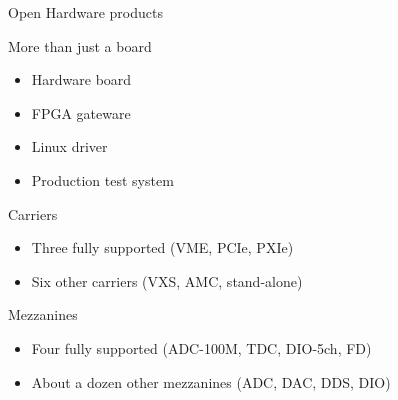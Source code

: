 \documentclass[compress,red]{beamer}
\begin{document}
\begin{frame}{Open Hardware products}

  \begin{block}{More than just a board}
    \begin{itemize}
    \item Hardware board
    \item FPGA gateware
    \item Linux driver
    \item Production test system
    \end{itemize}
  \end{block}

  \begin{block}{Carriers}
    \begin{itemize}
    \item Three fully supported (VME, PCIe, PXIe)
    \item Six other carriers (VXS, AMC, stand-alone)
    \end{itemize}
  \end{block}


  \begin{block}{Mezzanines}
    \begin{itemize}
    \item Four fully supported (ADC-100M, TDC, DIO-5ch, FD)
    \item About a dozen other mezzanines (ADC, DAC, DDS, DIO)
    \end{itemize}
  \end{block}



\end{frame}
\end{document}
